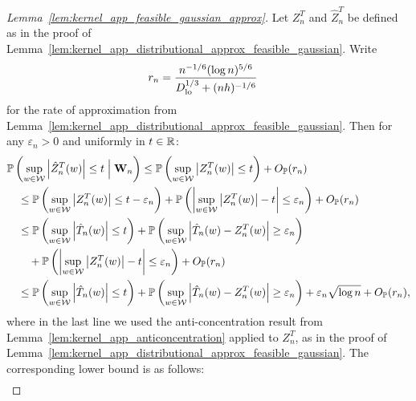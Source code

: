 \begin{proof}[Lemma~\ref{lem:kernel_app_feasible_gaussian_approx}]


  Let $Z_n^T$ and $\hat Z_n^T$ be defined
  as in the proof of
  Lemma~\ref{lem:kernel_app_distributional_approx_feasible_gaussian}.
  Write
  \begin{align*}
    r_n
    &=
    \frac{n^{-1/6}(\log n)^{5/6}}
    {D_{\textup{lo}}^{1/3} + (n h)^{-1/6}}
  \end{align*}
  for the rate of approximation from
  Lemma~\ref{lem:kernel_app_distributional_approx_feasible_gaussian}.
  Then for any $\varepsilon_n > 0$ and
  uniformly in $t \in \mathbb{R}$:
  \begin{align*}
    &\mathbb{P}\left(
      \sup_{w \in \mathcal{W}}
      \left|
      \hat Z_n^T(w)
      \right|
      \leq t
      \Bigm\vert \mathbf{W}_n
    \right)
    \leq
    \mathbb{P}\left(
      \sup_{w \in \mathcal{W}}
      \left|
      Z_n^T(w)
      \right|
      \leq t
    \right)
    +
    O_{\mathbb{P}}(r_n) \\
    &\quad\leq
    \mathbb{P}\left(
      \sup_{w \in \mathcal{W}}
      \left|
      Z_n^T(w)
      \right|
      \leq t - \varepsilon_n
    \right)
    +
    \mathbb{P}\left(
      \left|
      \sup_{w \in \mathcal{W}}
      \big|
      Z_n^T(w)
      \big|
      -t
      \right|
      \leq \varepsilon_n
    \right)
    +
    O_{\mathbb{P}}(r_n) \\
    &\quad\leq
    \mathbb{P}\left(
      \sup_{w \in \mathcal{W}}
      \left| \hat T_n(w) \right|
      \leq t
    \right)
    +
    \mathbb{P}\left(
      \sup_{w \in \mathcal{W}}
      \left| \hat T_n(w) - Z_n^T(w) \right|
      \geq \varepsilon_n
    \right) \\
    &\qquad+
    \mathbb{P}\left(
      \left|
      \sup_{w \in \mathcal{W}}
      \big|
      Z_n^T(w)
      \big|
      -t
      \right|
      \leq \varepsilon_n
    \right)
    +
    O_{\mathbb{P}}(r_n) \\
    &\quad\leq
    \mathbb{P}\left(
      \sup_{w \in \mathcal{W}}
      \left| \hat T_n(w) \right|
      \leq t
    \right)
    +
    \mathbb{P}\left(
      \sup_{w \in \mathcal{W}}
      \left| \hat T_n(w) - Z_n^T(w) \right|
      \geq \varepsilon_n
    \right)
    + \varepsilon_n \sqrt{\log n}
    + O_{\mathbb{P}}(r_n),
  \end{align*}
  where in the last line we used the anti-concentration result
  from Lemma~\ref{lem:kernel_app_anticoncentration}
  applied to $Z_n^T$,
  as in the proof of
  Lemma~\ref{lem:kernel_app_distributional_approx_feasible_gaussian}.
  The corresponding lower bound is as follows:
  \begin{align*}

\end{align*}
\end{proof}
